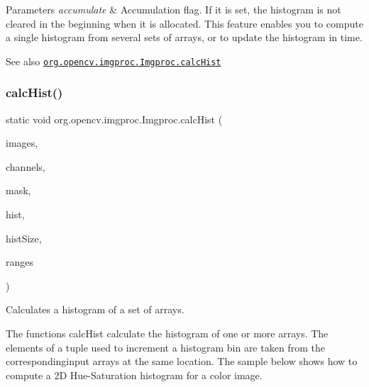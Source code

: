 \begin{DoxyParams}{Parameters}
\hline
{\em accumulate} & Accumulation flag. If it is set, the histogram is not cleared in the beginning when it is allocated. This feature enables you to compute a single histogram from several sets of arrays, or to update the histogram in time.\\
\hline
\end{DoxyParams}
\begin{DoxySeeAlso}{See also}
\href{http://docs.opencv.org/modules/imgproc/doc/histograms.html#calchist}{\tt org.\+opencv.\+imgproc.\+Imgproc.\+calc\+Hist} 
\end{DoxySeeAlso}
\mbox{\label{classorg_1_1opencv_1_1imgproc_1_1_imgproc_a6878eca2d6d70089c17a1c7b8125e544}} 
\subsubsection{\texorpdfstring{calc\+Hist()}{calcHist()}\hspace{0.1cm}{\footnotesize\ttfamily [2/2]}}
{\footnotesize\ttfamily static void org.\+opencv.\+imgproc.\+Imgproc.\+calc\+Hist (\begin{DoxyParamCaption}\item[{List$<$ \mbox{\hyperlink{classorg_1_1opencv_1_1core_1_1_mat}{Mat}} $>$}]{images,  }\item[{\mbox{\hyperlink{classorg_1_1opencv_1_1core_1_1_mat_of_int}{Mat\+Of\+Int}}}]{channels,  }\item[{\mbox{\hyperlink{classorg_1_1opencv_1_1core_1_1_mat}{Mat}}}]{mask,  }\item[{\mbox{\hyperlink{classorg_1_1opencv_1_1core_1_1_mat}{Mat}}}]{hist,  }\item[{\mbox{\hyperlink{classorg_1_1opencv_1_1core_1_1_mat_of_int}{Mat\+Of\+Int}}}]{hist\+Size,  }\item[{\mbox{\hyperlink{classorg_1_1opencv_1_1core_1_1_mat_of_float}{Mat\+Of\+Float}}}]{ranges }\end{DoxyParamCaption})\hspace{0.3cm}{\ttfamily [static]}}

Calculates a histogram of a set of arrays.

The functions {\ttfamily calc\+Hist} calculate the histogram of one or more arrays. The elements of a tuple used to increment a histogram bin are taken from the correspondinginput arrays at the same location. The sample below shows how to compute a 2D Hue-\/\+Saturation histogram for a color image. {\ttfamily }

